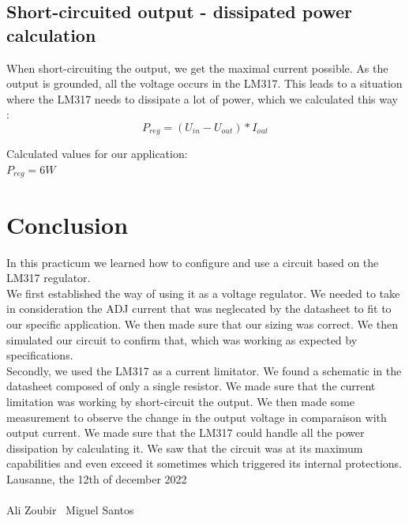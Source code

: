 \subsection{Short-circuited output - dissipated power calculation} \label{ssec:num16}
{
	When short-circuiting the output, we get the maximal current possible. As the output is grounded, all the voltage occurs in the LM317. This leads to a situation where the LM317 needs to dissipate a lot of power, which we calculated this way : \\
	
	\begin{equation}
		P_{reg} = (U_{in} - U_{out} ) * I_{out}
	\end{equation}

	Calculated values for our application:\\
	
	$ P_{reg} = 6W $ \\
}

\clearpage
\section{Conclusion}
{
	In this practicum we learned how to configure and use a circuit based on the LM317 regulator. \\
	We first established the way of using it as a voltage regulator. We needed to take in consideration the ADJ current that was neglecated by the datasheet to fit to our specific application. We then made sure that our sizing was correct. We then simulated our circuit to confirm that, which was working as expected by specifications.\\
	Secondly, we used the LM317 as a current limitator. We found a schematic in the datasheet composed of only a single resistor. We made sure that the current limitation was working by short-circuit the output. We then made some measurement to observe the change in the output voltage in comparaison with output current. We made sure that the LM317 could handle all the power dissipation by calculating it. We saw that the circuit was at its maximum capabilities and even exceed it sometimes which triggered its internal protections.\\
	
	Lausanne, the 12th of december 2022 \\
	\\
	Ali Zoubir \ Miguel Santos
}

\clearpage